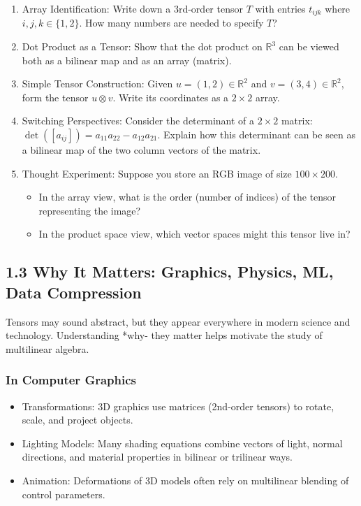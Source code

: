 \documentclass[
  letterpaper,
  DIV=11,
  numbers=noendperiod]{scrreprt}
\providecommand{\tightlist}{%
  \setlength{\itemsep}{0pt}\setlength{\parskip}{0pt}}
\begin{document}
\begin{enumerate}
\def\labelenumi{\arabic{enumi}.}
\item
  Array Identification: Write down a 3rd-order tensor \(T\) with entries
  \(t_{ijk}\) where \(i,j,k \in \{1,2\}\). How many numbers are needed
  to specify \(T\)?
\item
  Dot Product as a Tensor: Show that the dot product on \(\mathbb{R}^3\)
  can be viewed both as a bilinear map and as an array (matrix).
\item
  Simple Tensor Construction: Given \(u=(1,2)\in \mathbb{R}^2\) and
  \(v=(3,4)\in \mathbb{R}^2\), form the tensor \(u \otimes v\). Write
  its coordinates as a \(2 \times 2\) array.
\item
  Switching Perspectives: Consider the determinant of a \(2\times2\)
  matrix: \(\det([a_{ij}]) = a_{11}a_{22} - a_{12}a_{21}\). Explain how
  this determinant can be seen as a bilinear map of the two column
  vectors of the matrix.
\item
  Thought Experiment: Suppose you store an RGB image of size
  \(100 \times 200\).

  \begin{itemize}
  \tightlist
  \item
    In the array view, what is the order (number of indices) of the
    tensor representing the image?
  \item
    In the product space view, which vector spaces might this tensor
    live in?
  \end{itemize}
\end{enumerate}

\subsection{1.3 Why It Matters: Graphics, Physics, ML, Data
Compression}\label{why-it-matters-graphics-physics-ml-data-compression}

Tensors may sound abstract, but they appear everywhere in modern science
and technology. Understanding *why- they matter helps motivate the study
of multilinear algebra.

\subsubsection{In Computer Graphics}\label{in-computer-graphics}

\begin{itemize}
\tightlist
\item
  Transformations: 3D graphics use matrices (2nd-order tensors) to
  rotate, scale, and project objects.
\item
  Lighting Models: Many shading equations combine vectors of light,
  normal directions, and material properties in bilinear or trilinear
  ways.
\item
  Animation: Deformations of 3D models often rely on multilinear
  blending of control parameters.
\end{itemize}
\end{document}
